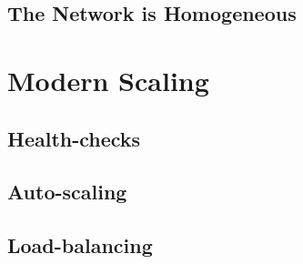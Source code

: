 \subsection{The Network is Homogeneous}

\section{Modern Scaling}

\subsection{Health-checks}

\subsection{Auto-scaling}

\subsection{Load-balancing}
